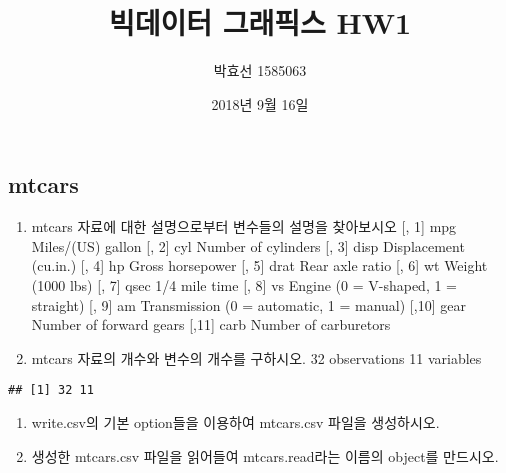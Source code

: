 \documentclass[]{article}
\title{빅데이터 그래픽스 HW1}
\author{박효선 1585063}
\date{2018년 9월 16일}
\newenvironment{Shaded}{\begin{snugshade}}{\end{snugshade}}
\newcommand{\KeywordTok}[1]{\textcolor[rgb]{0.13,0.29,0.53}{\textbf{#1}}}
\newcommand{\StringTok}[1]{\textcolor[rgb]{0.31,0.60,0.02}{#1}}
\newcommand{\CommentTok}[1]{\textcolor[rgb]{0.56,0.35,0.01}{\textit{#1}}}
\newcommand{\NormalTok}[1]{#1}
\begin{document}
\maketitle

\subsection{mtcars}\label{mtcars}

\begin{enumerate}
\def\labelenumi{\arabic{enumi})}
\item
  mtcars 자료에 대한 설명으로부터 변수들의 설명을 찾아보시오 {[}, 1{]}
  mpg Miles/(US) gallon {[}, 2{]} cyl Number of cylinders {[}, 3{]} disp
  Displacement (cu.in.) {[}, 4{]} hp Gross horsepower {[}, 5{]} drat
  Rear axle ratio {[}, 6{]} wt Weight (1000 lbs) {[}, 7{]} qsec 1/4 mile
  time {[}, 8{]} vs Engine (0 = V-shaped, 1 = straight) {[}, 9{]} am
  Transmission (0 = automatic, 1 = manual) {[},10{]} gear Number of
  forward gears {[},11{]} carb Number of carburetors
\item
  mtcars 자료의 개수와 변수의 개수를 구하시오. 32 observations 11
  variables
\end{enumerate}

\begin{Shaded}
\end{Shaded}

\begin{verbatim}
## [1] 32 11
\end{verbatim}

\begin{enumerate}
\def\labelenumi{\arabic{enumi})}
\setcounter{enumi}{2}
\item
  write.csv의 기본 option들을 이용하여 mtcars.csv 파일을 생성하시오.
\item
  생성한 mtcars.csv 파일을 읽어들여 mtcars.read라는 이름의 object를
  만드시오.
\end{enumerate}

\begin{Shaded}
\end{Shaded}
\end{document}
